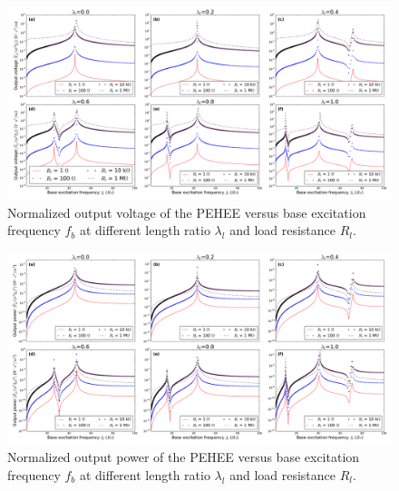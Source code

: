 \documentclass{elsarticle}
\begin{document}
\begin{figure}[!htbp]
    \centering
    \includegraphics[width=\textwidth]{./fig_output_voltage_vs_fr_Rl_laml_all}
    \caption{ Normalized output voltage of the PEHEE versus base excitation frequency $f_b$ at different length ratio $\lambda_l$ and load resistance $R_l$. }
    \label{fig:fig_output_voltage_vs_fr_Rl_laml_all}
\end{figure}

\begin{figure}[!htbp]
    \centering
    \includegraphics[width=\textwidth]{./fig_output_power_vs_fr_Rl_laml_all}
    \caption{ Normalized output power of the PEHEE versus base excitation frequency $f_b$ at different length ratio $\lambda_l$ and load resistance $R_l$. }
    \label{fig:fig_output_power_vs_fr_Rl_laml_all}
\end{figure}
\end{document}
